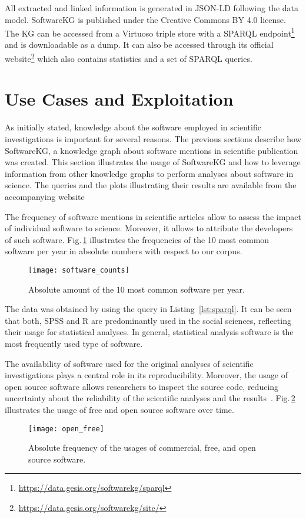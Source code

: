 \documentclass[runningheads]{llncs}
\newcommand{\figref}[1]{Fig.\,\ref{#1}}
\begin{document}
All extracted and linked information is generated in JSON-LD following the data model. 
SoftwareKG is published under the Creative Commons BY 4.0 license.
The KG can be accessed from a Virtuoso triple store with a SPARQL endpoint\footnote{\url{https://data.gesis.org/softwarekg/sparql}} and is downloadable as a dump\cite{Schindler_softwarekg_2020}.
It can also be accessed through its official website\footnote{\url{https://data.gesis.org/softwarekg/site/}} which also contains statistics and a set of SPARQL queries.

\section{Use Cases and Exploitation}
As initially stated, knowledge about the software employed in scientific investigations is important for several reasons.
The previous sections describe how SoftwareKG, a knowledge graph about software mentions in scientific publication was created.
This section illustrates the usage of SoftwareKG and how to leverage information from other knowledge graphs to perform analyses about software in science. 
The queries and the plots illustrating their results are available from the accompanying website

The frequency of software mentions in scientific articles allow to assess the impact of individual software to science.
Moreover, it allows to attribute the developers of such software.
\figref{fig:counts} illustrates the frequencies of the 10 most common software per year in absolute numbers with respect to our corpus.
\begin{figure}[tb]
    \centering
    \texttt{[image: software\_counts]}
    \caption{Absolute amount of the 10 most common software per year.}
    \label{fig:counts}
\end{figure}
The data was obtained by using the query in Listing~\ref{lst:sparql}.
It can be seen that both, SPSS and R are predominantly used in the social sciences, reflecting their usage for statistical analyses.
In general, statistical analysis software is the most frequently used type of software.

The availability of software used for the original analyses of scientific investigations plays a central role in its reproducibility.
Moreover, the usage of open source software allows researchers to inspect the source code, reducing uncertainty about the reliability of the scientific analyses and the results~\cite{Russo2016}.
\figref{fig:open_free} illustrates the usage of free and open source software over time.
\begin{figure}[tb]
    \centering
    \texttt{[image: open\_free]}
    \caption{Absolute frequency of the usages of commercial, free, and open source software.}
    \label{fig:open_free}  
\end{figure}
\end{document}
